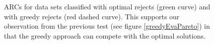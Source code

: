 \begin{figure}[!htbp]
\centering
\caption{ARCs for data sets classified with optimal rejects (green curve) and with greedy rejects (red dashed curve). This supports our observation from the previous test (see figure \ref{greedyEvaPareto}) in that the greedy approach can compete with the optimal solutions.}
\label{greedyEvaARC}
\end{figure}
